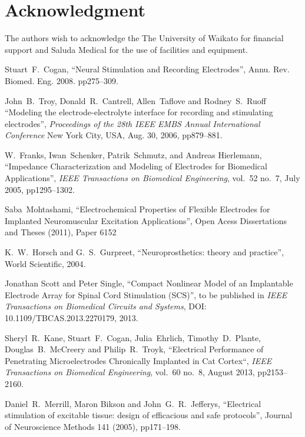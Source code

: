 \documentclass[journal, a4paper]{IEEEtran}
\begin{document}
\section*{Acknowledgment}
The authors wish to acknowledge the The University of Waikato for financial support and Saluda Medical for the use of facilities and equipment.

\begin{thebibliography}{99}


    Stuart~F.~Cogan,
    ``Neural Stimulation and Recording Electrodes'',
    Annu. Rev. Biomed. Eng. 2008. pp275--309.

    John~B.~Troy, Donald~R.~Cantrell, Allen~Taflove and Rodney~S.~Ruoff
    ``Modeling the electrode-electrolyte interface for recording and stimulating electrodes'',
    {\em Proceedings of the 28th IEEE EMBS Annual International Conference}
    New York City, USA, Aug. 30, 2006, pp879--881.

    W.~Franks, Iwan~Schenker, Patrik~Schmutz, and Andreas Hierlemann,
    ``Impedance Characterization and Modeling of Electrodes for Biomedical Applications'',
    \emph{IEEE Transactions on Biomedical Engineering},
    vol.~52 no.~7, July 2005, pp1295--1302.

    Saba~Mohtashami,
    ``Electrochemical Properties of Flexible Electrodes for Implanted Neuromuscular Excitation Applications'',
    Open Acess Dissertations and Theses (2011), Paper 6152

    K.~W.~Horsch and G.~S.~Gurpreet,
    ``Neuroprosthetics: theory and practice'',
    World Scientific, 2004.

    Jonathan Scott and Peter Single,
    ``Compact Nonlinear Model of an Implantable Electrode Array for Spinal Cord Stimulation (SCS)'',
    to be published in
    {\em IEEE Transactions on Biomedical Circuits and Systems},
    DOI: 10.1109/TBCAS.2013.2270179, 2013.

    Sheryl~R.~Kane, Stuart~F.~Cogan, Julia~Ehrlich, Timothy~D.~Plante, Douglas~B.~McCreery and Philip~R.~Troyk,
    ``Electrical Performance of Penetrating Microelectrodes Chronically Implanted in Cat Cortex``,
    {\em IEEE Transactions on Biomedical Engineering},
    vol.~60 no.~8, August 2013, pp2153--2160.

    Daniel~R.~Merrill, Maron Bikson and John~G.~R.\ Jefferys,
    ``Electrical stimulation of excitable tissue: design of efficacious and safe protocols'',
    Journal of Neuroscience Methods 141 (2005), pp171--198.


\end{thebibliography}
\end{document}
